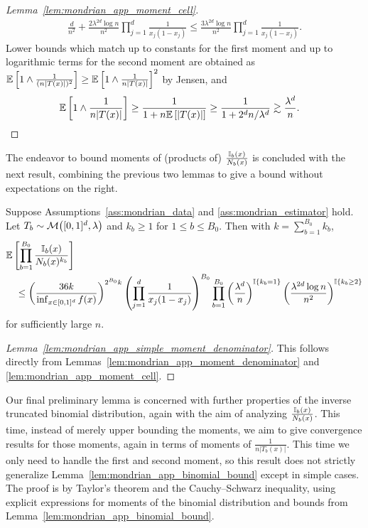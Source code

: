 \begin{proof}[Lemma~\ref{lem:mondrian_app_moment_cell}]
\begin{align*}
    \frac{d}{n^2}
    + \frac{2 \lambda^{2d} \log n}{n^2}
    \prod_{j=1}^d
    \frac{1}{x_j(1-x_j)}
    \leq
    \frac{3 \lambda^{2d} \log n}{n^2}
    \prod_{j=1}^d
    \frac{1}{x_j(1-x_j)}.
  \end{align*}
  Lower bounds which match up to constants for the first moment and up to
  logarithmic terms for the second moment are obtained as
  $\mathbb{E} \left[ 1 \wedge \frac{1}{(n|T(x)|)^2} \right]
  \geq \mathbb{E} \left[ 1 \wedge \frac{1}{n|T(x)|} \right]^2$
  by Jensen, and
  \begin{align*}
    \mathbb{E} \left[ 1 \wedge \frac{1}{n|T(x)|} \right]
    &\geq \frac{1}{1 + n \mathbb{E} \left[ |T(x)| \right]}
    \geq \frac{1}{1 + 2^d n / \lambda^d}
    \gtrsim \frac{\lambda^d}{n}.
  \end{align*}
\end{proof}

The endeavor to bound moments of (products of) $\frac{\mathbb{I}_b(x)}{N_b(x)}$ is
concluded with the next result, combining the previous two lemmas to give a
bound without expectations on the right.

\begin{lemma}%
  \label{lem:mondrian_app_simple_moment_denominator}
  Suppose Assumptions~\ref{ass:mondrian_data}
  and \ref{ass:mondrian_estimator} hold.
  Let $T_b \sim \mathcal{M}\big([0,1]^d, \lambda\big)$
  and $k_b \geq 1$ for $1 \leq b \leq B_0$.
  Then with $k = \sum_{b=1}^{B_0} k_b$,
  \begin{align*}
    &\mathbb{E}\left[
      \prod_{b=1}^{B_0}
      \frac{\mathbb{I}_b(x)}{N_b(x)^{k_b}}
    \right] \\
    &\quad\leq
    \left( \frac{36k}{\inf_{x \in [0,1]^d} f(x)} \right)^{2^{B_0} k}
    \left(
      \prod_{j=1}^{d} \frac{1}{x_j (1-x_j)}
    \right)^{B_0}
    \prod_{b=1}^{B_0}
    \left(
      \frac{\lambda^d}{n}
    \right)^{\mathbb{I} \left\{ k_b = 1 \right\}}
    \left(
      \frac{\lambda^{2d} \log n}{n^2}
    \right)^{\mathbb{I} \left\{ k_b \geq 2 \right\}}
  \end{align*}
  for sufficiently large $n$.
\end{lemma}

\begin{proof}[Lemma~\ref{lem:mondrian_app_simple_moment_denominator}]
  This follows directly from
  Lemmas~\ref{lem:mondrian_app_moment_denominator} and
  \ref{lem:mondrian_app_moment_cell}.
\end{proof}

Our final preliminary lemma is concerned with further properties of
the inverse truncated binomial distribution, again with the aim
of analyzing $\frac{\mathbb{I}_b(x)}{N_b(x)}$.
This time, instead of merely upper bounding the moments,
we aim to give convergence results for those moments,
again in terms of moments of $\frac{1}{n |T_b(x)|}$.
This time we only need to handle the first
and second moment, so this result does not strictly generalize
Lemma~\ref{lem:mondrian_app_binomial_bound} except in simple cases.
The proof is by Taylor's theorem and the Cauchy--Schwarz inequality,
using explicit expressions for moments of the binomial distribution
and bounds from Lemma~\ref{lem:mondrian_app_binomial_bound}.

